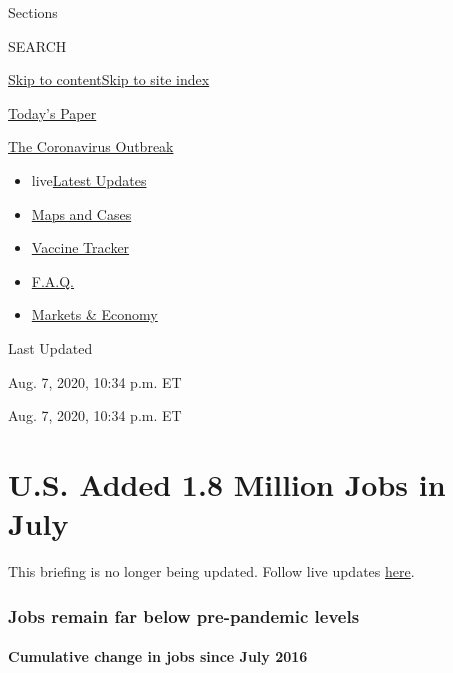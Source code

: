 Sections

SEARCH

\protect\hyperlink{site-content}{Skip to
content}\protect\hyperlink{site-index}{Skip to site index}

\href{https://myaccount.nytimes.com/auth/login?response_type=cookie\&client_id=vi}{}

\href{https://www.nytimes.com/section/todayspaper}{Today's Paper}

\href{https://www.nytimes.com/news-event/coronavirus}{The Coronavirus
Outbreak}

\begin{itemize}
\tightlist
\item
  live\href{https://www.nytimes.com/2020/08/08/world/coronavirus-updates.html}{Latest
  Updates}
\item
  \href{https://www.nytimes.com/interactive/2020/us/coronavirus-us-cases.html}{Maps
  and Cases}
\item
  \href{https://www.nytimes.com/interactive/2020/science/coronavirus-vaccine-tracker.html}{Vaccine
  Tracker}
\item
  \href{https://www.nytimes.com/interactive/2020/world/coronavirus-tips-advice.html}{F.A.Q.}
\item
  \href{https://www.nytimes.com/live/2020/08/07/business/stock-market-today-coronavirus}{Markets
  \& Economy}
\end{itemize}

Last Updated

Aug. 7, 2020, 10:34 p.m. ET

Aug. 7, 2020, 10:34 p.m. ET

\hypertarget{us-added-18-million-jobs-in-july}{%
\section{U.S. Added 1.8 Million Jobs in
July}\label{us-added-18-million-jobs-in-july}}

This briefing is no longer being updated. Follow live updates
\href{https://www.nytimes.com/2020/08/07/world/covid-19-news.html}{here}.

\hypertarget{jobs-remain-far-below-pre-pandemic-levels}{%
\subsubsection{Jobs remain far below pre-pandemic
levels}\label{jobs-remain-far-below-pre-pandemic-levels}}

\hypertarget{cumulative-change-in-jobs-since-july-2016}{%
\paragraph{Cumulative change in jobs since July
2016}\label{cumulative-change-in-jobs-since-july-2016}}


